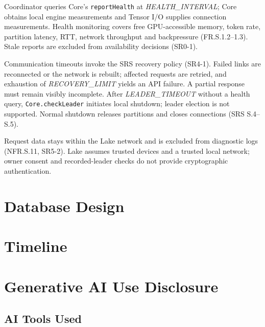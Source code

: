 \documentclass[12pt, titlepage]{article}
\begin{document}
Coordinator queries Core's \texttt{reportHealth} at
\textit{HEALTH\_INTERVAL}; Core obtains local engine measurements and Tensor
I/O supplies connection measurements. Health monitoring covers free
GPU-accessible memory, token rate, partition latency, RTT, network throughput
and backpressure (FR.S.1.2--1.3). Stale reports are excluded from availability
decisions (SR0-1).

Communication timeouts invoke the SRS recovery policy (SR4-1). Failed links
are reconnected or the network is rebuilt; affected requests are retried,
and exhaustion of \textit{RECOVERY\_LIMIT} yields an API failure. A partial
response must remain visibly incomplete. After \textit{LEADER\_TIMEOUT} without
a health query, \texttt{Core.checkLeader} initiates local shutdown; leader
election is not supported. Normal shutdown releases partitions
and closes connections (SRS S.4--S.5).

Request data stays within the Lake network and is excluded from diagnostic
logs (NFR.S.11, SR5-2). Lake assumes trusted devices and a trusted local network;
owner consent and recorded-leader checks do not provide cryptographic
authentication.

\endgroup

\section{Database Design}


\section{Timeline}



\section{Generative AI Use Disclosure}

\subsection{AI Tools Used}
\end{document}
